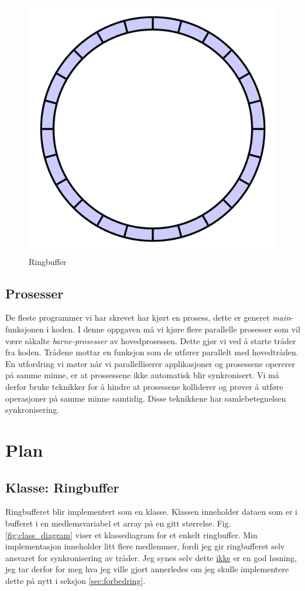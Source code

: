 \documentclass[a4paper, 12pt]{article}
\begin{document}
    \begin{figure}[h!]
      \centering
      \includegraphics[scale=0.2]{res/ringbuffer.png}
      \caption{Ringbuffer}
      \label{fig:ringbuffer}
    \end{figure}

    \subsection{Prosesser}
    De fleste programmer vi har skrevet har kjørt en prosess, dette er generet \textit{main}-funksjonen i koden. I denne oppgaven må vi kjøre flere parallelle prosesser som vil være såkalte \textit{barne-prosesser} av hovedprosessen. Dette gjør vi ved å starte tråder fra koden. Trådene mottar en funksjon som de utfører parallelt med hovedtråden. En utfordring vi møter når vi parallelliserer applikasjoner og prosessene opererer på samme minne, er at prossessene ikke automatisk blir synkronisert. Vi må derfor bruke teknikker for å hindre at prosessene kolliderer og prøver å utføre operasjoner på samme minne samtidig. Disse teknikkene har samlebetegnelsen synkronisering.

    \section{Plan}
    \subsection{Klasse: Ringbuffer}
    Ringbufferet blir implementert som en klasse. Klassen inneholder dataen som er i bufferet i en medlemsvariabel et array på en gitt størrelse. Fig. \ref{fig:class_diagram} viser et klassediagram for et enkelt ringbuffer. Min implementasjon inneholder litt flere medlemmer, fordi jeg gir ringbufferet selv ansvaret for synkronisering av tråder. Jeg synes selv dette \underline{ikke} er en god løsning, jeg tar derfor for meg hva jeg ville gjort annerledes om jeg skulle implementere dette på nytt i seksjon \ref{sec:forbedring}.
\end{document}
